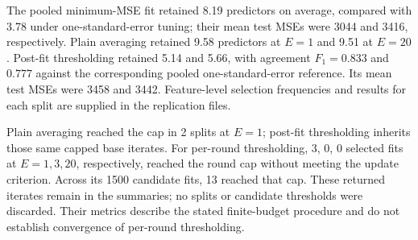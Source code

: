 The pooled minimum-MSE fit retained 8.19 predictors on average, compared with 3.78 under one-standard-error tuning; their mean test MSEs were 3044 and 3416, respectively. Plain averaging retained 9.58 predictors at $E=1$ and 9.51 at $E=20$. Post-fit thresholding retained 5.14 and 5.66, with agreement $F_1=0.833$ and $0.777$ against the corresponding pooled one-standard-error reference. Its mean test MSEs were 3458 and 3442. Feature-level selection frequencies and results for each split are supplied in the replication files.

Plain averaging reached the cap in 2 splits at $E=1$; post-fit thresholding inherits those same capped base iterates. For per-round thresholding, 3, 0, 0 selected fits at $E=1,3,20$, respectively, reached the round cap without meeting the update criterion. Across its 1500 candidate fits, 13 reached that cap. These returned iterates remain in the summaries; no splits or candidate thresholds were discarded. Their metrics describe the stated finite-budget procedure and do not establish convergence of per-round thresholding.

